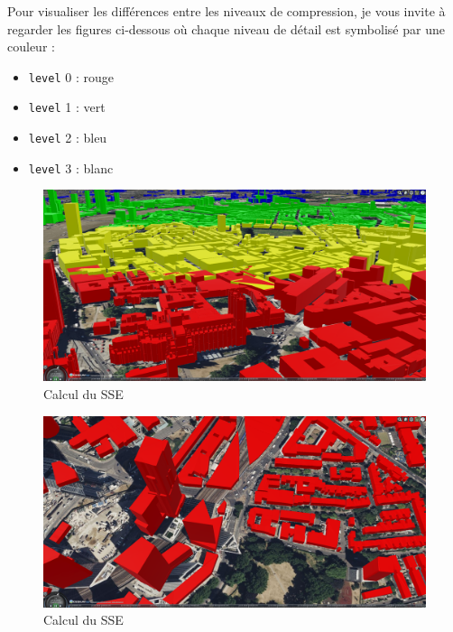 Pour visualiser les différences entre les niveaux de compression, je vous invite à regarder les figures ci-dessous où chaque niveau de détail est symbolisé par une couleur :

\begin{itemize}
    \item \texttt{level} 0 : rouge
    \item \texttt{level} 1 : vert
    \item \texttt{level} 2 : bleu
    \item \texttt{level} 3 : blanc
\end{itemize}

\begin{figure}[H]
    \centering
    \includegraphics[width=1\textwidth]{assets/figures/lods-horizon.png}
    \caption{Calcul du SSE \cite{3d-tiles-specification}}
    \label{fig:lods-colors}
\end{figure}

\begin{figure}[H]
    \centering
    \includegraphics[width=1\textwidth]{assets/figures/lods0.png}
    \caption{Calcul du SSE \cite{3d-tiles-specification}}
    \label{fig:lods-colors}
\end{figure}

